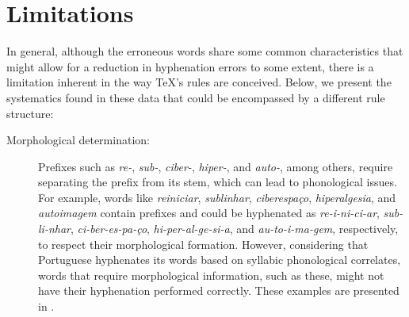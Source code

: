 \section{Limitations}

In general, although the erroneous words share some common characteristics that
might allow for a reduction in hyphenation errors to some extent, there is a
limitation inherent in the way \TeX{}'s rules are conceived. Below, we present
the systematics found in these data that could be encompassed by a different
rule structure:

\begin{description} 
    \item[Morphological determination:\label{morpho-det}] Prefixes such as \emph{re-},
	\emph{sub-}, \emph{ciber-}, \emph{hiper-}, and \emph{auto-}, among others, require separating the
	prefix from its stem, which can lead to phonological issues. For example, words like
	\emph{reiniciar}, \emph{sublinhar}, \emph{ciberespaço}, \emph{hiperalgesia}, and \emph{autoimagem} contain prefixes and could be hyphenated as 
	\emph{re-i-ni-ci-ar}, \emph{sub-li-nhar}, \emph{ci-ber-es-pa-ço}, \emph{hi-per-al-ge-si-a}, and \emph{au-to-i-ma-gem}, 
	respectively, to respect their morphological formation. However,
        considering that Portuguese hyphenates its words based on syllabic phonological correlates, 
	words that require morphological information, such as these, might not have their hyphenation performed correctly. 
	These examples are presented in .



\end{description}
